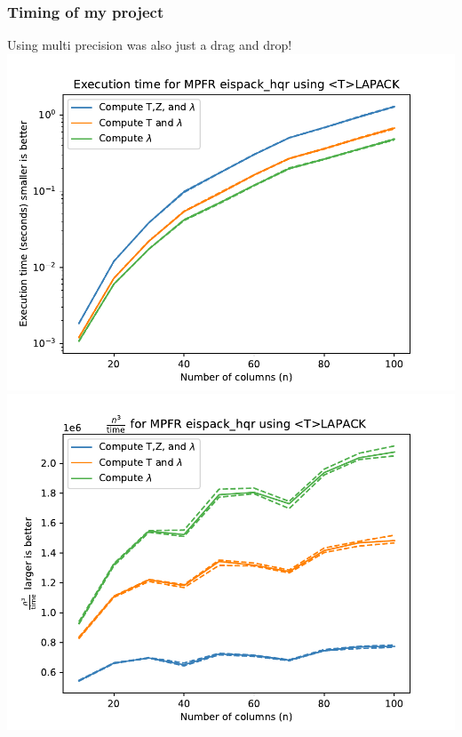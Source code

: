\documentclass[12pt]{beamer}
\begin{document}
    \begin{frame}
        \frametitle{Timing of my project}
        Using multi precision was also just a drag and drop!
        \includegraphics[width=.45\textwidth]{numericalExperiments/eispackHqrTlapackTimeMPFR.pdf}
        \includegraphics[width=.45\textwidth]{numericalExperiments/eispackHqrTlapackPerfMPFR.pdf}
    \end{frame}

\end{document}
